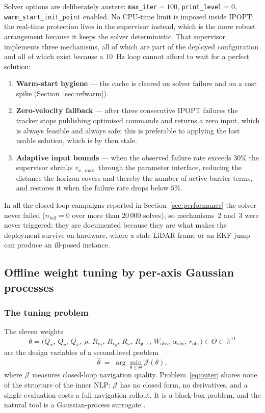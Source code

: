 \documentclass[11pt,a4paper]{article}
\newcommand{\R}{\mathbb{R}}
\newcommand{\Wobs}{W_{\mathrm{obs}}}
\newcommand{\aobs}{\alpha_{\mathrm{obs}}}
\newcommand{\robs}{r_{\mathrm{obs}}}
\newcommand{\Rjerk}{R_{\mathrm{jerk}}}
\begin{document}
Solver options are deliberately austere: \texttt{max\_iter}$=100$, \texttt{print\_level}$=0$,
\texttt{warm\_start\_init\_point} enabled. No CPU-time limit is imposed inside IPOPT; the real-time
protection lives in the supervisor instead, which is the more robust arrangement because it keeps the solver
deterministic. That supervisor implements three mechanisms, all of which are part of the deployed
configuration and all of which exist because a $10$~Hz loop cannot afford to wait for a perfect solution:
\begin{enumerate}[label=\arabic*.]
  \item \textbf{Warm-start hygiene} --- the cache is cleared on solver failure and on a cost spike
        (Section~\ref{sec:refwarm}).
  \item \textbf{Zero-velocity fallback} --- after three consecutive IPOPT failures the tracker stops
        publishing optimised commands and returns a zero input, which is always feasible and always safe;
        this is preferable to applying the last usable solution, which is by then stale.
  \item \textbf{Adaptive input bounds} --- when the observed failure rate exceeds $30\%$ the supervisor
        shrinks $v_{x,\max}$ through the parameter interface, reducing the distance the horizon covers and
        thereby the number of active barrier terms, and restores it when the failure rate drops below $5\%$.
\end{enumerate}
In all the closed-loop campaigns reported in Section~\ref{sec:performance} the solver never failed
($n_{\mathrm{fail}}=0$ over more than $20\,000$ solves), so mechanisms~2 and~3 were never triggered; they are
documented because they are what makes the deployment survive on hardware, where a stale LiDAR frame or an EKF
jump can produce an ill-posed instance.

\subsection{Offline weight tuning by per-axis Gaussian processes}
\label{sec:bo}

\subsubsection{The tuning problem}

The eleven weights
\begin{equation}
  \theta=\big(Q_x,\,Q_y,\,Q_\psi,\,\rho,\,R_{v_x},\,R_{v_y},\,R_\omega,\,\Rjerk,\,\Wobs,\,\aobs,\,\robs\big)\in\Theta\subset\R^{11}
  \label{eq:theta}
\end{equation}
are the design variables of a second-level problem
\begin{equation}
  \hat\theta \;=\; \arg\min_{\theta\in\Theta} \mathcal{J}(\theta),
  \label{eq:outer}
\end{equation}
where $\mathcal{J}$ measures closed-loop navigation quality. Problem~\eqref{eq:outer} shares none of the
structure of the inner NLP: $\mathcal{J}$ has no closed form, no derivatives, and a single evaluation costs a
full navigation rollout. It is a black-box problem, and the natural tool is a Gaussian-process surrogate
\cite{rasmussen2006gp,shahriari2016bo}.
\end{document}
